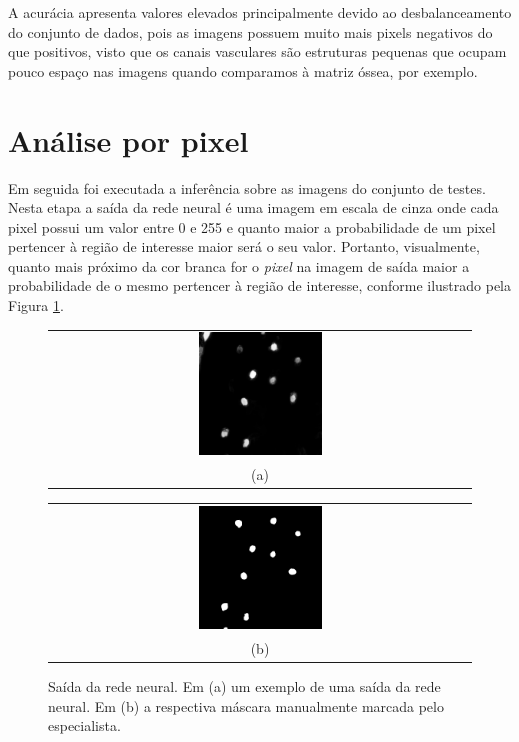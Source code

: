 A acurácia apresenta valores elevados principalmente devido ao desbalanceamento do conjunto de dados, pois as imagens possuem muito mais pixels negativos do que positivos, visto que os canais vasculares são estruturas pequenas que ocupam pouco espaço nas imagens quando comparamos à matriz óssea, por exemplo. 

\section{Análise por pixel}

Em seguida foi executada a inferência sobre as imagens do conjunto de testes. Nesta etapa a saída da rede neural é uma imagem em escala de cinza onde cada pixel possui um valor entre 0 e 255 e quanto maior a probabilidade de um pixel pertencer à região de interesse maior será o seu valor. Portanto, visualmente, quanto mais próximo da cor branca for o \textit{pixel} na imagem de saída maior a probabilidade de o mesmo pertencer à região de interesse, conforme ilustrado pela Figura \ref{fig:masks-result-and-original-640-202-r2c1}.

\begin{figure}[H]
    \center
    \begin{tabular}{@{}c@{}}
        \includegraphics[width=0.3\textwidth]{figures/4_results/network_640_mask.png}
        \\[\abovecaptionskip]
    \small (a)
    \end{tabular}
    \begin{tabular}{@{}c@{}}
        \includegraphics[width=0.3\textwidth]{figures/4_results/manual_640_mask.png}
        \\[\abovecaptionskip]
    \small (b)
    \end{tabular}
    \caption[Saída da rede neural.]{Saída da rede neural. Em (a) um exemplo de uma saída da rede neural. Em (b) a respectiva máscara manualmente marcada pelo especialista.}
    \label{fig:masks-result-and-original-640-202-r2c1}
\end{figure}

